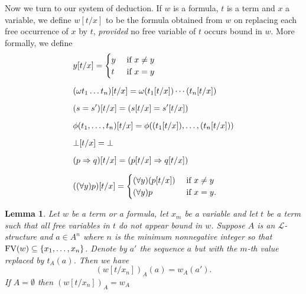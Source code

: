 \documentclass{report}
\theoremstyle{definition}
\theoremstyle{plain}
\newtheorem{lem}[thm]{Lemma}
\theoremstyle{definition}
\begin{document}
	Now we turn to our system of deduction. If $w$ is a formula, $t$ is a term and $x$ a variable, we define $w[t/x]$ to be the formula obtained from $w$ on replacing each free occurrence of $x$ by $t$, \emph{provided} no free variable of $t$ occurs bound in $w$. More formally, we define
	\begin{align*}
		&y[t/x] = \begin{cases}
			y & \textnormal{ if }x \neq y\\
			t & \textnormal{ if }x = y
		\end{cases}\\[6pt]
		&(\omega t_1 \ldots t_n)[t/x] = \omega (t_1[t/x]) \cdots (t_n[t/x])\\[6pt]
		&(s=s')[t/x] = (s[t/x] = s'[t/x])\\[6pt]
		&\phi(t_1, \ldots ,t_n)[t/x] = \phi((t_1[t/x]), \ldots ,(t_n[t/x]))\\[6pt]
		&\bot[t/x] = \bot\\[6pt]
		&(p \Rightarrow q)[t/x] = (p[t/x] \Rightarrow q[t/x])\\[6pt]
		&((\forall y)p)[t/x]= \begin{cases}
			(\forall y) (p[t/x]) & \textnormal{ if } x \neq y\\
			(\forall y)p & \textnormal{ if }x =y.
		\end{cases} 
	\end{align*}
	\begin{lem}\label{lem:subs_op}
		Let $w$ be a term or a formula, let $x_m$ be a variable and let $t$ be a term such that all free variables in $t$ do not appear bound in $w$. Suppose $A$ is an $\mathcal{L}$-structure and $a\in A^{n}$ where $n$ is the minimum nonnegative integer so that $\textnormal{FV}(w)\subseteq \{x_1,\ldots,x_n\}$. Denote by $a'$ the sequence $a$ but with the $m$-th value replaced by $t_A(a)$. Then we have
		\[
		(w[t/x_n])_A(a) = w_A(a'). 
		\]
		If $A = \emptyset$ then $(w[t/x_n])_A = w_A$
	\end{lem}
\end{document}
